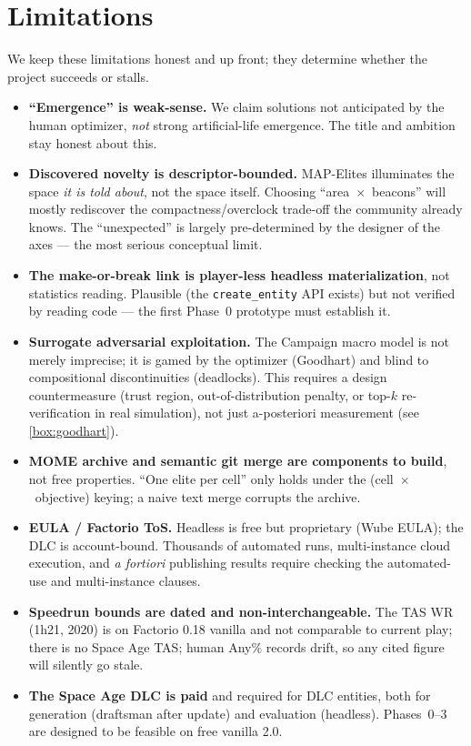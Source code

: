 \documentclass[11pt,a4paper]{article}
\begin{document}
\section{Limitations}
\label{sec:limits}

We keep these limitations honest and up front; they determine whether the project
succeeds or stalls.

\begin{itemize}
\item \textbf{``Emergence'' is weak-sense.} We claim solutions not anticipated by
  the human optimizer, \emph{not} strong artificial-life emergence. The title and
  ambition stay honest about this.
\item \textbf{Discovered novelty is descriptor-bounded.} MAP-Elites illuminates
  the space \emph{it is told about}, not the space itself. Choosing
  ``area~$\times$~beacons'' will mostly rediscover the compactness/overclock
  trade-off the community already knows. The ``unexpected'' is largely
  pre-determined by the designer of the axes --- the most serious conceptual
  limit.
\item \textbf{The make-or-break link is player-less headless materialization}, not
  statistics reading. Plausible (the \texttt{create\_entity} API exists) but not
  verified by reading code --- the first Phase~0 prototype must establish it.
\item \textbf{Surrogate adversarial exploitation.} The Campaign macro model is not
  merely imprecise; it is gamed by the optimizer (Goodhart) and blind to
  compositional discontinuities (deadlocks). This requires a design countermeasure
  (trust region, out-of-distribution penalty, or top-$k$ re-verification in real
  simulation), not just a-posteriori measurement (see \cref{box:goodhart}).
\item \textbf{MOME archive and semantic git merge are components to build}, not
  free properties. ``One elite per cell'' only holds under the
  (cell~$\times$~objective) keying; a naive text merge corrupts the archive.
\item \textbf{EULA / Factorio ToS.} Headless is free but proprietary (Wube EULA);
  the DLC is account-bound. Thousands of automated runs, multi-instance cloud
  execution, and \emph{a fortiori} publishing results require checking the
  automated-use and multi-instance clauses.
\item \textbf{Speedrun bounds are dated and non-interchangeable.} The TAS WR
  (1h21, 2020) is on Factorio 0.18 vanilla and not comparable to current play;
  there is no Space Age TAS; human Any\% records drift, so any cited figure will
  silently go stale.
\item \textbf{The Space Age DLC is paid} and required for DLC entities, both for
  generation (draftsman after update) and evaluation (headless). Phases~0--3 are
  designed to be feasible on free vanilla 2.0.
\end{itemize}
\end{document}
